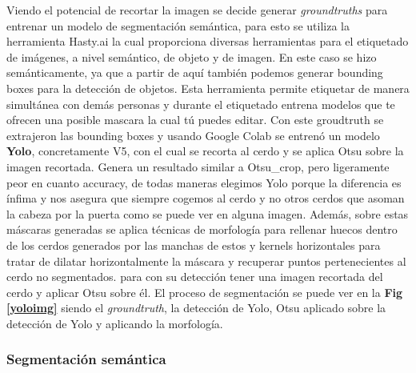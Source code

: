 ﻿\documentclass[10pt,a4paper,twocolumn,twoside]{article}
\begin{document}
    Viendo el potencial de recortar la imagen se decide generar \textit{groundtruths} para entrenar un modelo de segmentación semántica, para esto se utiliza la herramienta Hasty.ai \cite{hasty} la cual proporciona diversas herramientas para el etiquetado de imágenes, a nivel semántico, de objeto y de imagen. En este caso se hizo semánticamente, ya que a partir de aquí también podemos generar bounding boxes para la detección de objetos. Esta herramienta permite etiquetar de manera simultánea con demás personas y durante el etiquetado entrena modelos que te ofrecen una posible mascara la cual tú puedes editar. Con este groudtruth se extrajeron las bounding boxes y usando Google Colab se entrenó un modelo \textbf{Yolo}\cite{yolo}, concretamente V5, con el cual se recorta al cerdo y se aplica Otsu sobre la imagen recortada. Genera un resultado similar a Otsu\_crop, pero ligeramente peor en cuanto accuracy, de todas maneras elegimos Yolo porque la diferencia es ínfima y nos asegura que siempre cogemos al cerdo y no otros cerdos que asoman la cabeza por la puerta como se puede ver en alguna imagen. Además, sobre estas máscaras generadas se aplica técnicas de morfología para rellenar huecos dentro de los cerdos generados por las manchas de estos y kernels horizontales para tratar de dilatar horizontalmente la máscara y recuperar puntos pertenecientes al cerdo no segmentados. \cite{yolo} para con su detección tener una imagen recortada del cerdo y aplicar Otsu sobre él. El proceso de segmentación se puede ver en la \textbf{Fig \ref{yoloimg}} siendo \textbf{} el \textit{groundtruth}, \textbf{} la detección de Yolo, \textbf{} Otsu aplicado sobre la detección de Yolo y \textbf{} aplicando la morfología.
    
    \subsubsection{Segmentación semántica}
    
\end{document}
